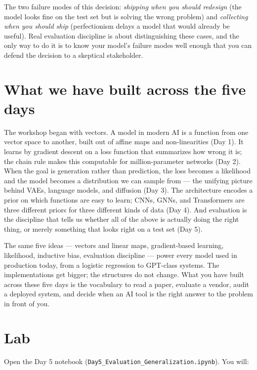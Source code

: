 The two failure modes of this decision: \emph{shipping when you should redesign} (the model looks fine on the test set but is solving the wrong problem) and \emph{collecting when you should ship} (perfectionism delays a model that would already be useful). Real evaluation discipline is about distinguishing these cases, and the only way to do it is to know your model's failure modes well enough that you can defend the decision to a skeptical stakeholder.

\section{What we have built across the five days}

The workshop began with vectors. A model in modern AI is a function from one vector space to another, built out of affine maps and non-linearities (Day 1). It learns by gradient descent on a loss function that summarizes how wrong it is; the chain rule makes this computable for million-parameter networks (Day 2). When the goal is generation rather than prediction, the loss becomes a likelihood and the model becomes a distribution we can sample from --- the unifying picture behind VAEs, language models, and diffusion (Day 3). The architecture encodes a prior on which functions are easy to learn; CNNs, GNNs, and Transformers are three different priors for three different kinds of data (Day 4). And evaluation is the discipline that tells us whether all of the above is actually doing the right thing, or merely something that looks right on a test set (Day 5).

The same five ideas --- vectors and linear maps, gradient-based learning, likelihood, inductive bias, evaluation discipline --- power every model used in production today, from a logistic regression to GPT-class systems. The implementations get bigger; the structures do not change. What you have built across these five days is the vocabulary to read a paper, evaluate a vendor, audit a deployed system, and decide when an AI tool is the right answer to the problem in front of you.

\section*{Lab}

Open the Day 5 notebook (\texttt{Day5\_Evaluation\_Generalization.ipynb}). You will:

